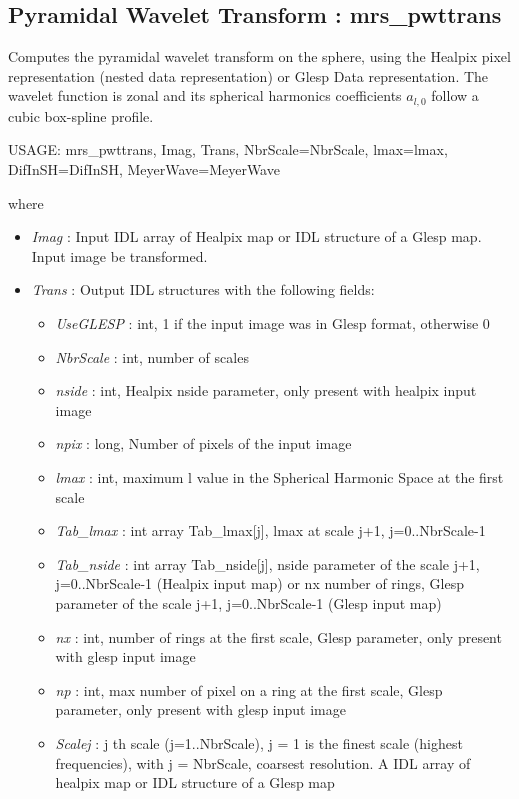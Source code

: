 \subsection{Pyramidal Wavelet Transform : mrs\_pwttrans}
Computes the pyramidal wavelet transform on the sphere, using the Healpix pixel representation (nested data representation) or Glesp Data representation. 
The wavelet function is zonal and its spherical harmonics coefficients $a_{l,0}$ follow a cubic box-spline profile. 
{\bf
\begin{center}
     USAGE: mrs\_pwttrans, Imag, Trans, NbrScale=NbrScale, lmax=lmax, DifInSH=DifInSH, MeyerWave=MeyerWave 
\end{center}}
where 
\begin{itemize}
\item {\em Imag} : Input IDL array of Healpix map or IDL structure of a Glesp map. Input image be transformed. 
\item {\em Trans} : Output IDL structures with the following fields:   
\begin{itemize}
\item {\em UseGLESP} : int, 1 if the input image was in Glesp format, otherwise 0
\item {\em NbrScale} : int, number of scales 
\item {\em nside} : int, Healpix nside parameter, only present with healpix input image
\item {\em npix} : long, Number of pixels of the input image
\item {\em lmax} : int, maximum l value in the Spherical Harmonic Space at the first scale
\item {\em Tab\_lmax} : int array Tab\_lmax[j], lmax at scale j+1, j=0..NbrScale-1
\item {\em Tab\_nside} : int array Tab\_nside[j], nside parameter of the scale j+1, j=0..NbrScale-1 (Healpix input map) 
or nx number of rings, Glesp parameter of the scale j+1, j=0..NbrScale-1 (Glesp input map)
\item {\em nx} : int, number of rings at the first scale, Glesp parameter, only present with glesp input image
\item {\em np} : int, max number of pixel on a ring at the first scale, Glesp parameter, only present with glesp input image
\item {\em Scalej} : j th scale (j=1..NbrScale), j = 1 is the finest scale (highest frequencies), 
with j = NbrScale, coarsest resolution. A IDL array of healpix map or IDL structure of a Glesp map

\end{itemize}
\end{itemize}

